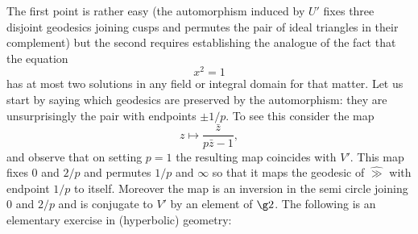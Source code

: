 The first point is rather easy 
(the automorphism induced by $U'$ fixes three disjoint geodesics joining 
cusps and permutes the pair of ideal triangles in their complement)
 but the second requires establishing
 the analogue of the fact that  the equation
$$x^2 = 1$$
has at most two solutions in any field or integral domain for that matter. 
Let us start by saying which geodesics are preserved 
by the automorphism: they are unsurprisingly the pair with endpoints $\pm 1/p$.
To see this consider the map
\begin{equation}
\label{inversion}
z \mapsto \frac{\bar{z}}{ p\bar{z} - 1},
\end{equation}
and observe that on setting $p=1$ the resulting map coincides with $V'$.
This map fixes $0$ and $2/p$ and permutes $1/p$ and $\infty$
 so that it maps the geodesic of $\hat{\gg}$ with endpoint $1/p$ to itself.
 Moreover the map  is an inversion in the semi circle joining $0$ and $2/p$  
and is conjugate to $V'$ by an element of $\g2$. 
The following is an elementary exercise in (hyperbolic) geometry:

